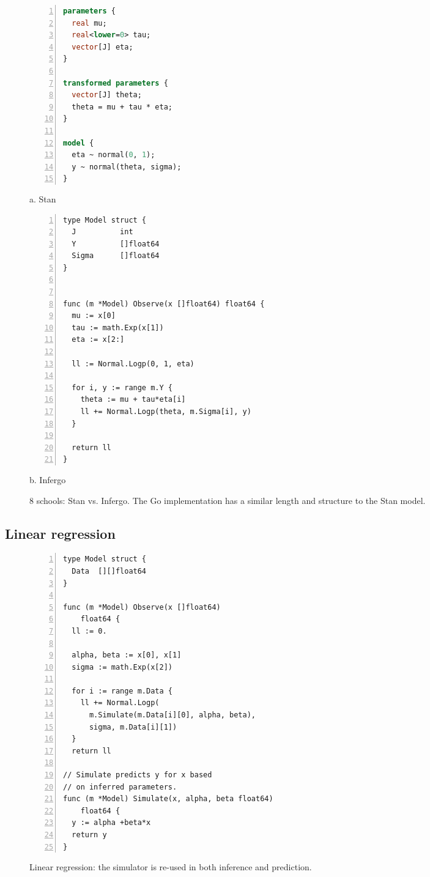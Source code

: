 \documentclass[sigplan,review,10pt,anonymous]{acmart}
\begin{document}
\begin{sloppypar}
\begin{figure*}
\begin{minipage}{0.45\textwidth}
\begin{lstlisting}[language=Stan,numbers=left]
parameters {
  real mu;
  real<lower=0> tau;
  vector[J] eta;
}

transformed parameters {
  vector[J] theta;
  theta = mu + tau * eta;
}

model {
  eta ~ normal(0, 1);
  y ~ normal(theta, sigma);
}
\end{lstlisting}

\centering
a. Stan
	\end{minipage}
	\hfill
	\begin{minipage}{0.45\textwidth}
\begin{lstlisting}[numbers=left]
type Model struct {
  J          int
  Y          []float64
  Sigma      []float64
}


func (m *Model) Observe(x []float64) float64 {
  mu := x[0]
  tau := math.Exp(x[1])
  eta := x[2:]

  ll := Normal.Logp(0, 1, eta)

  for i, y := range m.Y {
    theta := mu + tau*eta[i]
    ll += Normal.Logp(theta, m.Sigma[i], y)
  }

  return ll
}
\end{lstlisting}
\centering
b. Infergo
	\end{minipage}
	\caption{8 schools: Stan vs. Infergo. The Go implementation
	has a similar length and structure to the Stan model.}
	\label{fig:8-schools}
\end{figure*}

\subsection{Linear regression}

\begin{figure}
\begin{lstlisting}[numbers=left]
type Model struct {
  Data  [][]float64
}

func (m *Model) Observe(x []float64)
    float64 {
  ll := 0.

  alpha, beta := x[0], x[1]
  sigma := math.Exp(x[2])

  for i := range m.Data {
    ll += Normal.Logp(
      m.Simulate(m.Data[i][0], alpha, beta),
      sigma, m.Data[i][1])
  }
  return ll

// Simulate predicts y for x based
// on inferred parameters.
func (m *Model) Simulate(x, alpha, beta float64)
    float64 {
  y := alpha +beta*x
  return y
}
\end{lstlisting}
\caption{Linear regression: the simulator is re-used in both
	inference and prediction.}
\label{fig:linear-regression}
\end{figure}


\end{sloppypar}
\end{document}

